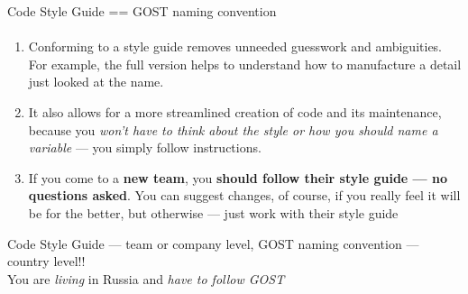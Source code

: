 \documentclass[aspectratio=169]{beamer}
\begin{document}
\begin{frame}[t]{Code Style Guide == GOST naming convention}
    \framesubtitle{}
    \vspace{-0.4cm}
    \begin{enumerate}
        \item Conforming to a style guide removes unneeded guesswork and ambiguities. For example, the full version helps to understand how to manufacture a detail just looked at the name.
        \item It also allows for a more streamlined creation of code and its maintenance, because you \textit{won't have to think about the style or how you should name a variable} --- you simply follow instructions.
        \item If you come to a \textbf{new team}, you \textbf{should follow their style guide --- no questions asked}. You can suggest changes, of course, if you really feel it will be for the better, but otherwise --- just work with their style guide
    \end{enumerate}

    \begin{center}
        Code Style Guide --- team or company level, GOST naming convention --- country level!! \\
        You are \textit{living} in Russia and \textit{have to follow GOST}
    \end{center}
\end{frame}
\end{document}
